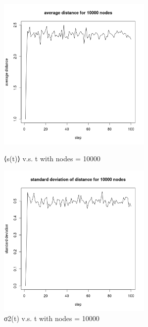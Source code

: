 \documentclass[draftcls,12pt,onecolumn]{IEEEtran}
\begin{document}
\begin{figure}[htbp]
\centering
\begin{minipage}[t]{0.48\textwidth}
\centering
\includegraphics[width=7.5cm]{2_1_d_10000_distance.png}
\caption{⟨s(t)⟩ v.s. t with nodes = 10000}
\end{minipage}
\begin{minipage}[t]{0.48\textwidth}
\centering
\includegraphics[width=7.5cm]{2_1_d_10000_deviation.png}
\caption{σ2(t) v.s. t with nodes = 10000}
\end{minipage}
\end{figure}
\end{document}
